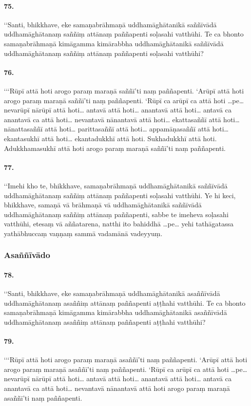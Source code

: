 \paragraph{75.}
‘‘Santi, bhikkhave, eke samaṇabrāhmaṇā uddhamāghātanikā saññīvādā uddhamāghātanaṃ saññiṃ attānaṃ paññapenti soḷasahi vatthūhi. Te ca bhonto samaṇabrāhmaṇā kimāgamma kimārabbha uddhamāghātanikā saññīvādā uddhamāghātanaṃ saññiṃ attānaṃ paññapenti soḷasahi vatthūhi?

\paragraph{76.}
‘‘‘Rūpī attā hoti arogo paraṃ maraṇā saññī’ti naṃ paññapenti. ‘Arūpī attā hoti arogo paraṃ maraṇā saññī’ti naṃ paññapenti. ‘Rūpī ca arūpī ca attā hoti …pe… nevarūpī nārūpī attā hoti… antavā attā hoti… anantavā attā hoti… antavā ca anantavā ca attā hoti… nevantavā nānantavā attā hoti… ekattasaññī attā hoti… nānattasaññī attā hoti… parittasaññī attā hoti… appamāṇasaññī attā hoti… ekantasukhī attā hoti… ekantadukkhī attā hoti. Sukhadukkhī attā hoti. Adukkhamasukhī attā hoti arogo paraṃ maraṇā saññī’ti naṃ paññapenti.

\paragraph{77.}
‘‘Imehi kho te, bhikkhave, samaṇabrāhmaṇā uddhamāghātanikā saññīvādā uddhamāghātanaṃ saññiṃ attānaṃ paññapenti soḷasahi vatthūhi. Ye hi keci, bhikkhave, samaṇā vā brāhmaṇā vā uddhamāghātanikā saññīvādā uddhamāghātanaṃ saññiṃ attānaṃ paññapenti, sabbe te imeheva soḷasahi vatthūhi, etesaṃ vā aññatarena, natthi ito bahiddhā …pe… yehi tathāgatassa yathābhuccaṃ vaṇṇaṃ sammā vadamānā vadeyyuṃ.

\subsubsection{Asaññīvādo}

\paragraph{78.}
‘‘Santi, bhikkhave, eke samaṇabrāhmaṇā uddhamāghātanikā asaññīvādā uddhamāghātanaṃ asaññiṃ attānaṃ paññapenti aṭṭhahi vatthūhi. Te ca bhonto samaṇabrāhmaṇā kimāgamma kimārabbha uddhamāghātanikā asaññīvādā uddhamāghātanaṃ asaññiṃ attānaṃ paññapenti aṭṭhahi vatthūhi?

\paragraph{79.}
‘‘‘Rūpī attā hoti arogo paraṃ maraṇā asaññī’ti naṃ paññapenti. ‘Arūpī attā hoti arogo paraṃ maraṇā asaññī’ti naṃ paññapenti. ‘Rūpī ca arūpī ca attā hoti …pe… nevarūpī nārūpī attā hoti… antavā attā hoti… anantavā attā hoti… antavā ca anantavā ca attā hoti… nevantavā nānantavā attā hoti arogo paraṃ maraṇā asaññī’ti naṃ paññapenti.

